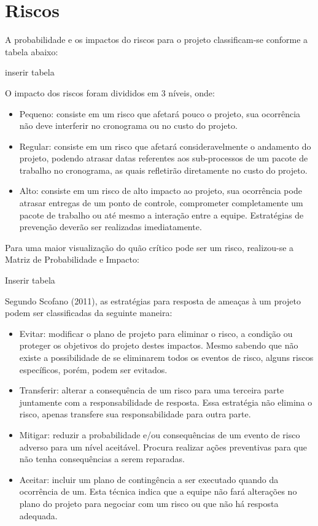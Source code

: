 \section{Riscos}

A probabilidade e os impactos do riscos para o projeto classificam-se conforme a tabela abaixo:

inserir tabela

O impacto dos riscos foram divididos em 3 níveis, onde:

\begin{itemize}
	\item Pequeno: consiste em um risco que afetará pouco o projeto, sua ocorrência não deve interferir no cronograma ou no custo do projeto.
	\item Regular: consiste em um risco que afetará consideravelmente o andamento do projeto, podendo atrasar datas referentes aos sub-processos de um pacote de trabalho no cronograma, as quais refletirão diretamente no custo do projeto.
	\item Alto: consiste em um risco de alto impacto ao projeto, sua ocorrência pode atrasar entregas de um ponto de controle, comprometer completamente um pacote de trabalho ou até mesmo a interação entre a equipe. Estratégias de prevenção deverão ser realizadas imediatamente.
\end{itemize}

Para uma maior visualização do quão crítico pode ser um risco, realizou-se a Matriz de Probabilidade e Impacto:

Inserir tabela

Segundo Scofano (2011), as estratégias para resposta de ameaças à um projeto podem ser classificadas da seguinte maneira:

\begin{itemize}
	\item Evitar: modificar o plano de projeto para eliminar o risco, a condição ou proteger os objetivos do projeto destes impactos. Mesmo sabendo que não existe a possibilidade de se eliminarem todos os eventos de risco, alguns riscos específicos, porém, podem ser evitados.
	\item Transferir: alterar a consequência de um risco para uma terceira parte juntamente com a responsabilidade de resposta. Essa estratégia não elimina o risco, apenas transfere sua responsabilidade para outra parte.
	\item Mitigar: reduzir a probabilidade e/ou consequências de um evento de risco adverso para um nível aceitável. Procura realizar ações preventivas para que não tenha consequências a serem reparadas.
	\item Aceitar: incluir um plano de contingência a ser executado quando da ocorrência de um. Esta técnica indica que a equipe não fará alterações no plano do projeto para negociar com um risco ou que não há resposta adequada.
\end{itemize}

